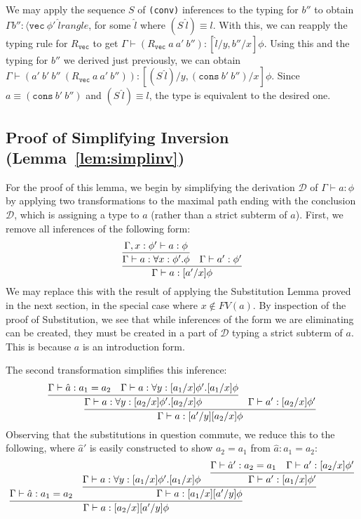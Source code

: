 \documentclass[copyright]{eptcs}
\newcommand{\vc}[0]{\texttt{vec}}
\newcommand{\cons}[0]{\texttt{cons}}
\begin{document}
We may apply the sequence $S$ of \texttt{(conv)} inferences to the
typing for $b''$ to obtain $\Gamma
b'':\langle\vc\ \phi'\ \hat{l}rangle$, for some $\hat{l}$ where
$(S\ \hat{l})\equiv l$.  With this, we can reapply the typing rule for
$R_\vc$ to get
$\Gamma\vdash(R_\vc\ a\ a'\ b''):[\hat{l}/y,b''/x]\phi$.  Using this
and the typing for $b''$ we derived just previously, we can obtain
$\Gamma\vdash(a'\ b'\ b''\ (R_\vc\ a\ a'\ b'')):[(S\ \hat{l})/y,(\cons\ b'\ b'')/x]\phi$.
Since $a\equiv(\cons\ b'\ b'')$ and $(S\ \hat{l})\equiv l$, the type
is equivalent to the desired one.

\subsection{Proof of Simplifying Inversion (Lemma~\ref{lem:simplinv})}
\label{sec:simplinv}

For the proof of this lemma, we begin by simplifying the derivation
$\mathcal{D}$ of $\Gamma\vdash a:\phi$ by applying two transformations
to the maximal path ending with the conclusion $\mathcal{D}$, which is
assigning a type to $a$ (rather than a strict subterm of $a$). First,
we remove all inferences of the following form:
\[
\infer{\Gamma\vdash a:[a'/x]\phi}
      {\infer{\Gamma\vdash a:\forall x:\phi'.\phi}
             {\Gamma, x:\phi'\vdash a:\phi} &
       \Gamma \vdash a':\phi'}
\]
\noindent We may replace this with the result of applying the
Substitution Lemma proved in the next section, in the special case
where $x\not\in\textit{FV}(a)$.  By inspection of the proof of
Substitution, we see that while inferences of the form we are eliminating
can be created, they must be created in a part of $\mathcal{D}$ typing
a strict subterm of $a$.  This is because $a$ is an introduction form.

The second transformation simplifies this inference:
\[
\infer{\Gamma\vdash a:[a'/y][a_2/x]\phi}
      {\infer{\Gamma\vdash a:\forall y:[a_2/x]\phi'.[a_2/x]\phi}
             {\Gamma\vdash \hat{a}:a_1 = a_2 &
              \Gamma\vdash a:\forall y:[a_1/x]\phi'.[a_1/x]\phi} &
       \Gamma\vdash a':[a_2/x]\phi'}
\]
\noindent Observing that the substitutions in question commute,
we reduce this to the following, where $\hat{a}'$ is easily
constructed to show $a_2 = a_1$ from $\hat{a}:a_1 = a_2$:
\[
\infer{\Gamma\vdash a:[a_2/x][a'/y]\phi}
      {\Gamma\vdash \hat{a}:a_1 = a_2 &
       \infer{\Gamma\vdash a:[a_1/x][a'/y]\phi}
             {\Gamma\vdash a:\forall y:[a_1/x]\phi'.[a_1/x]\phi &
              \infer{\Gamma\vdash a':[a_1/x]\phi'}
                    {\Gamma\vdash \hat{a}':a_2 = a_1 & \Gamma\vdash a':[a_2/x]\phi'}}}
\]
\end{document}
